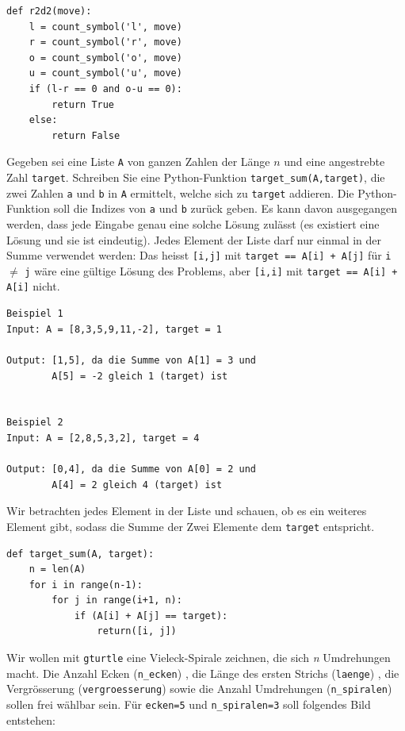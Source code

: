 \begin{questions}
\begin{solution}
\begin{lstlisting}
def r2d2(move):
    l = count_symbol('l', move)
    r = count_symbol('r', move)
    o = count_symbol('o', move)
    u = count_symbol('u', move)
    if (l-r == 0 and o-u == 0):
        return True
    else:
        return False
\end{lstlisting}
\end{solution}

\clearpage
{}

Gegeben sei eine Liste \lstinline|A| von ganzen Zahlen der Länge $n$ und eine angestrebte Zahl \mbox{\lstinline|target|.} Schreiben Sie eine Python-Funktion \lstinline|target_sum(A,target)|, die zwei Zahlen \lstinline|a| und \lstinline|b| in \lstinline|A| ermittelt, welche sich zu \lstinline|target| addieren. Die Python-Funktion soll die Indizes von \lstinline|a| und \lstinline|b| zurück geben. Es kann davon ausgegangen werden, dass jede Eingabe genau eine solche Lösung zulässt (es existiert eine Lösung und sie ist eindeutig). Jedes Element der Liste darf nur einmal in der Summe verwendet werden: Das heisst \lstinline|[i,j]| mit \lstinline|target == A[i] + A[j]| für \lstinline|i| $\neq$ \lstinline|j| wäre eine gültige Lösung des Problems, aber \lstinline|[i,i]| mit \lstinline|target == A[i] + A[i]| nicht.
\begin{lstlisting}[numbers=none,framexleftmargin=0em,xleftmargin=0em]
Beispiel 1
Input: A = [8,3,5,9,11,-2], target = 1

Output: [1,5], da die Summe von A[1] = 3 und
        A[5] = -2 gleich 1 (target) ist


Beispiel 2
Input: A = [2,8,5,3,2], target = 4

Output: [0,4], da die Summe von A[0] = 2 und
        A[4] = 2 gleich 4 (target) ist
\end{lstlisting}


\begin{solution}
Wir betrachten jedes Element in der Liste und schauen, ob es ein weiteres Element gibt, sodass die Summe der Zwei Elemente dem \lstinline|target| entspricht.
\begin{lstlisting}
def target_sum(A, target):
    n = len(A)
    for i in range(n-1):
        for j in range(i+1, n):
            if (A[i] + A[j] == target):
                return([i, j])
\end{lstlisting}
\end{solution}

\clearpage
{}
Wir wollen mit \lstinline|gturtle| eine Vieleck-Spirale zeichnen, die sich \textit{n} Umdrehungen macht. Die Anzahl Ecken (\lstinline|n_ecken|) , die Länge des ersten Strichs (\lstinline|laenge|) , die Vergrösserung (\lstinline|vergroesserung|) sowie die Anzahl Umdrehungen (\lstinline|n_spiralen|) sollen frei wählbar sein. Für \lstinline|ecken=5| und \lstinline|n_spiralen=3| soll folgendes Bild entstehen:


\end{questions}
